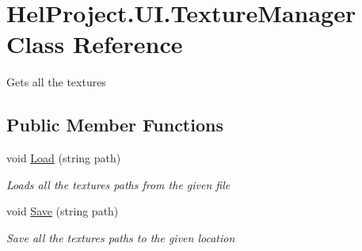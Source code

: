\hypertarget{class_hel_project_1_1_u_i_1_1_texture_manager}{}\section{Hel\+Project.\+U\+I.\+Texture\+Manager Class Reference}
\label{class_hel_project_1_1_u_i_1_1_texture_manager}


Gets all the textures  


\subsection*{Public Member Functions}
\begin{DoxyCompactItemize}
\item 
void \hyperlink{class_hel_project_1_1_u_i_1_1_texture_manager_ada156bc3a5f02b869a558d3ed2fd73c2}{Load} (string path)
\begin{DoxyCompactList}\small\item\em Loads all the textures paths from the given file \end{DoxyCompactList}\item 
void \hyperlink{class_hel_project_1_1_u_i_1_1_texture_manager_af20f01be3ff211887c33209abdeb72e5}{Save} (string path)
\begin{DoxyCompactList}\small\item\em Save all the textures paths to the given location \end{DoxyCompactList}\end{DoxyCompactItemize}
